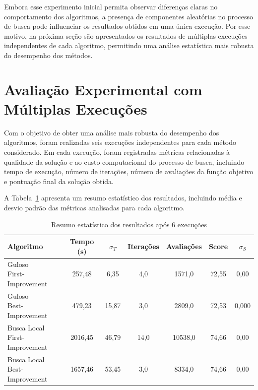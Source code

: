 Embora esse experimento inicial permita observar diferenças claras no comportamento 
dos algoritmos, a presença de componentes aleatórias no processo de busca 
pode influenciar os resultados obtidos em uma única execução. Por esse motivo, na 
próxima seção são apresentados os resultados de múltiplas execuções 
independentes de cada algoritmo, permitindo uma análise estatística mais robusta do 
desempenho dos métodos.

\section{Avaliação Experimental com Múltiplas Execuções}

Com o objetivo de obter uma análise mais robusta do desempenho dos algoritmos, foram 
realizadas seis execuções independentes para cada método considerado. 
Em cada execução, foram registradas métricas relacionadas à qualidade da solução e ao 
custo computacional do processo de busca, incluindo tempo de execução, 
número de iterações, número de avaliações da função objetivo e pontuação final da 
solução obtida.

A Tabela~\ref{tab:benchmark_multiplas_execucoes} apresenta um resumo estatístico 
dos resultados, incluindo média e desvio padrão das métricas analisadas 
para cada algoritmo.

\begin{table}[H]
\centering
\caption{Resumo estatístico dos resultados após 6 execuções}
\label{tab:benchmark_multiplas_execucoes}
\begin{tabular}{lcccccc}
\toprule
Algoritmo & Tempo (s) & $\sigma_T$ & Iterações & Avaliações & Score & $\sigma_S$ \\
\midrule
\makecell[l]{Guloso \\ First-Improvement} & 257,48 & 6,35 & 4,0 & 1571,0 & 72,55 & 0,00 \\[4pt]
\makecell[l]{Guloso \\ Best-Improvement} & 479,23 & 15,87 & 3,0 & 2809,0 & 72,53 & 0,000 \\[10pt]
\makecell[l]{Busca Local \\ First-Improvement} & 2016,45 & 46,79 & 14,0 & 10538,0 & 74,66 & 0,00 \\[4pt]
\makecell[l]{Busca Local \\ Best-Improvement} & 1657,46 & 53,45 & 3,0 & 8334,0 & 74,66 & 0,00 \\
\bottomrule
\end{tabular}
\end{table}

